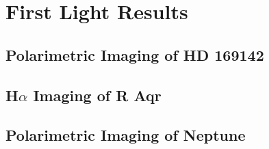 \section{First Light Results}\label{sec:firstlight}

\subsection{Polarimetric Imaging of HD 169142\label{sec:hd169142}}

\subsection{H$\alpha$ Imaging of R Aqr\label{sec:raqr}}

\subsection{Polarimetric Imaging of Neptune\label{sec:neptune}}
